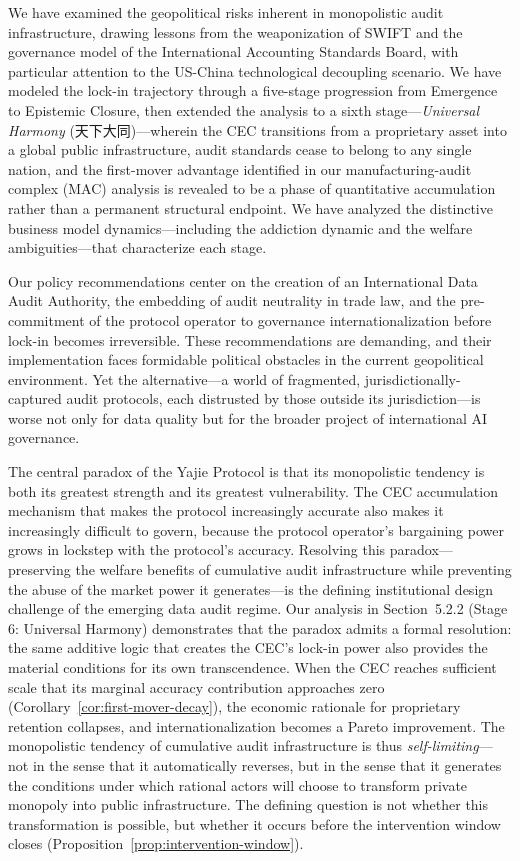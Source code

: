 \documentclass[12pt,a4paper]{ctexart}
\theoremstyle{definition}
\theoremstyle{remark}
\begin{document}
We have examined the geopolitical risks inherent in monopolistic audit infrastructure, drawing lessons from the weaponization of SWIFT and the governance model of the International Accounting Standards Board, with particular attention to the US-China technological decoupling scenario. We have modeled the lock-in trajectory through a five-stage progression from Emergence to Epistemic Closure, then extended the analysis to a sixth stage—\textit{Universal Harmony} (天下大同)—wherein the CEC transitions from a proprietary asset into a global public infrastructure, audit standards cease to belong to any single nation, and the first-mover advantage identified in our manufacturing-audit complex (MAC) analysis is revealed to be a phase of quantitative accumulation rather than a permanent structural endpoint. We have analyzed the distinctive business model dynamics—including the addiction dynamic and the welfare ambiguities—that characterize each stage.

Our policy recommendations center on the creation of an International Data Audit Authority, the embedding of audit neutrality in trade law, and the pre-commitment of the protocol operator to governance internationalization before lock-in becomes irreversible. These recommendations are demanding, and their implementation faces formidable political obstacles in the current geopolitical environment. Yet the alternative—a world of fragmented, jurisdictionally-captured audit protocols, each distrusted by those outside its jurisdiction—is worse not only for data quality but for the broader project of international AI governance.

The central paradox of the Yajie Protocol is that its monopolistic tendency is both its greatest strength and its greatest vulnerability. The CEC accumulation mechanism that makes the protocol increasingly accurate also makes it increasingly difficult to govern, because the protocol operator's bargaining power grows in lockstep with the protocol's accuracy. Resolving this paradox—preserving the welfare benefits of cumulative audit infrastructure while preventing the abuse of the market power it generates—is the defining institutional design challenge of the emerging data audit regime. Our analysis in Section~5.2.2 (Stage 6: Universal Harmony) demonstrates that the paradox admits a formal resolution: the same additive logic that creates the CEC's lock-in power also provides the material conditions for its own transcendence. When the CEC reaches sufficient scale that its marginal accuracy contribution approaches zero (Corollary~\ref{cor:first-mover-decay}), the economic rationale for proprietary retention collapses, and internationalization becomes a Pareto improvement. The monopolistic tendency of cumulative audit infrastructure is thus \textit{self-limiting}—not in the sense that it automatically reverses, but in the sense that it generates the conditions under which rational actors will choose to transform private monopoly into public infrastructure. The defining question is not whether this transformation is possible, but whether it occurs before the intervention window closes (Proposition~\ref{prop:intervention-window}).
\end{document}
